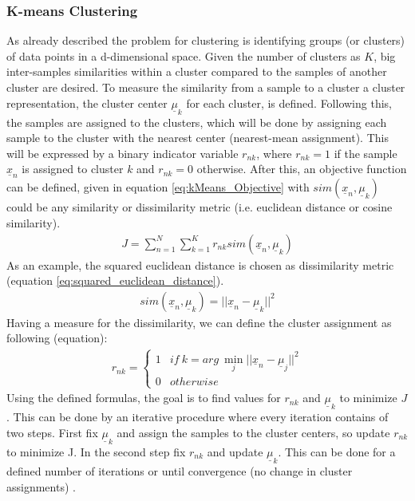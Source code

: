 \documentclass[12pt,DIV14,BCOR12mm,a4paper,footexclude,headinclude,halfparskip-,twoside,openright,openany,cleardoubleempty,idxtotoc,bibtotoc]{scrreprt} %
\numberwithin{equation}{chapter}
\begin{document}
\subsubsection{K-means Clustering}
As already described the problem for clustering is identifying groups (or clusters) of data points in a d-dimensional space. Given the number of clusters as $K$, big inter-samples similarities within a cluster compared to the samples of another cluster are desired. To measure the similarity from a sample to a cluster a cluster representation, the cluster center $\underline{\mu}_{k}$ for each cluster, is defined. Following this, the samples are assigned to the clusters, which will be done by assigning each sample to the cluster with the nearest center (nearest-mean assignment). This will be expressed by a binary indicator variable $r_{nk}$, where $r_{nk} = 1$ if the sample $\underline{x}_{n}$ is assigned to cluster $k$ and $r_{nk} = 0$ otherwise. After this, an objective function can be defined, given in equation \ref{eq:kMeans_Objective} with $sim(\underline{x}_{n}, \underline{\mu}_{k})$ could be any similarity or dissimilarity metric (i.e. euclidean distance or cosine similarity).
\begin{align}
J = \sum_{n=1}^{N} \sum_{k=1}^{K} r_{nk} sim(\underline{x}_{n}, \underline{\mu}_{k})\label{eq:kMeans_Objective}
\end{align}
As an example, the squared euclidean distance is chosen as dissimilarity metric (equation \ref{eq:squared_euclidean_distance}).
\begin{align}
sim(\underline{x}_{n}, \underline{\mu}_{k}) = ||\underline{x}_{n} - \underline{\mu}_{k}||^{2}\label{eq:squared_euclidean_distance}
\end{align}
Having a measure for the dissimilarity, we can define the cluster assignment as following (equation):
\begin{align}
r_{nk} = \begin{cases} 1 & if\ k = arg\ \underset{j}\min ||\underline{x}_{n} - \underline{\mu}_{j}||^{2}\\0 & otherwise\end{cases}\label{eq:sample_clusterassignment}
\end{align}
Using the defined formulas, the goal is to find values for $r_{nk}$ and $\underline{\mu}_{k}$ to minimize $J$. This can be done by an iterative procedure where every iteration contains of two steps. First fix $\underline{\mu}_{k}$ and assign the samples to the cluster centers, so update $r_{nk}$ to minimize J. In the second step fix $r_{nk}$ and update $\underline{\mu}_{k}$. This can be done for a defined number of iterations or until convergence (no change in cluster assignments) \cite{Bishop}.\\
\end{document}
